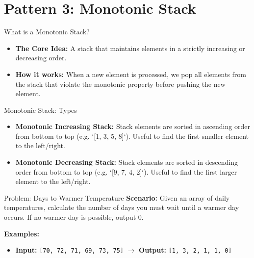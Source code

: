 \section{Pattern 3: Monotonic Stack}

\begin{frame}[c]{\empty}
    \begin{center}
        \Large\textbf{\secname}
    \end{center}
\end{frame}

\begin{frame}{What is a Monotonic Stack?}
  \begin{itemize}
    \item \textbf{The Core Idea:} A stack that maintains elements in a strictly increasing or decreasing order.
    \item \textbf{How it works:} When a new element is processed, we pop all elements from the stack that violate the monotonic property before pushing the new element.
  \end{itemize}
\end{frame}

\begin{frame}{Monotonic Stack: Types}
  \begin{itemize}
    \item \textbf{Monotonic Increasing Stack:} Stack elements are sorted in ascending order from bottom to top (e.g. `[1, 3, 5, 8]`). Useful to find the first smaller element to the left/right.
    \item \textbf{Monotonic Decreasing Stack:} Stack elements are sorted in descending order from bottom to top (e.g. `[9, 7, 4, 2]`). Useful to find the first larger element to the left/right.
  \end{itemize}
\end{frame}

\begin{frame}[fragile]{Problem: Days to Warmer Temperature}
  \textbf{Scenario:}
  Given an array of daily temperatures, calculate the number of days you must wait until a warmer day occurs. If no warmer day is possible, output 0.
  
  \vspace{0.3cm}
  \textbf{Examples:}
  \begin{itemize}
    \item \textbf{Input:} \texttt{[70, 72, 71, 69, 73, 75]} $\rightarrow$ \textbf{Output:} \texttt{[1, 3, 2, 1, 1, 0]}
  \end{itemize}
\end{frame}

